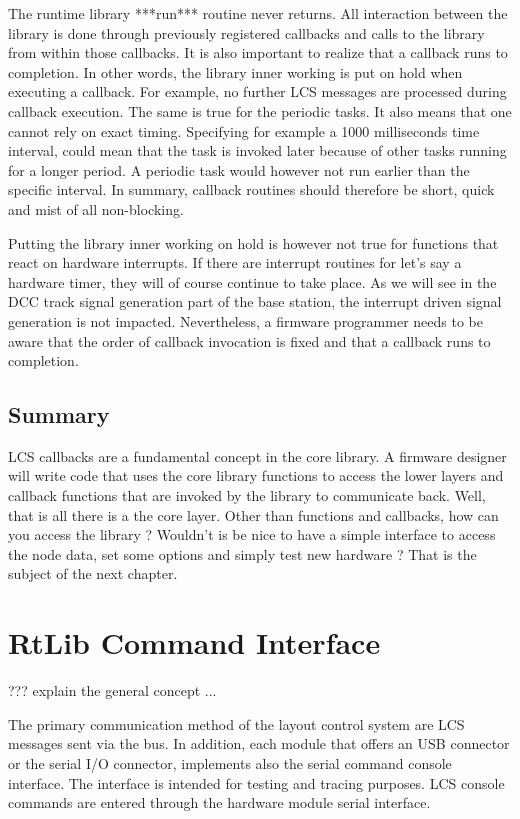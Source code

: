 The runtime library ***run*** routine never returns. All interaction between the library is done through previously registered callbacks and calls to the library from within those callbacks. It is also important to realize that a callback runs to completion. In other words, the library inner working is put on hold when executing a callback. For example, no further LCS messages are processed during callback execution. The same is true for the periodic tasks. It also means that one cannot rely on exact timing. Specifying for example a 1000 milliseconds time interval, could mean that the task is invoked later because of other tasks running for a longer period. A periodic task would however not run earlier than the specific interval. In summary, callback routines should therefore be short, quick and mist of all non-blocking.

Putting the library inner working on hold is however not true for functions that react on hardware interrupts. If there are interrupt routines for let's say a hardware timer, they will of course continue to take place. As we will see in the DCC track signal generation part of the base station, the interrupt driven signal generation is not impacted. Nevertheless, a firmware programmer needs to be aware that the order of callback invocation is fixed and that a callback runs to completion.

\section{Summary}

LCS callbacks are a fundamental concept in the core library. A firmware designer will write code that uses the core library functions to access the lower layers and callback functions that are invoked by the library to communicate back. Well, that is all there is a the core layer. Other than functions and callbacks, how can you access the library ? Wouldn't is be nice to have a simple interface to access the node data, set some options and simply test new hardware ? That is the subject of the next chapter.

\chapter{RtLib Command Interface}

???  explain the general concept ...

The primary communication method of the layout control system are LCS messages sent via the bus. In addition, each module that offers an USB connector or the serial I/O connector, implements also the serial command console interface. The interface is intended for testing and tracing purposes. LCS console commands are entered through the hardware module serial interface. 

